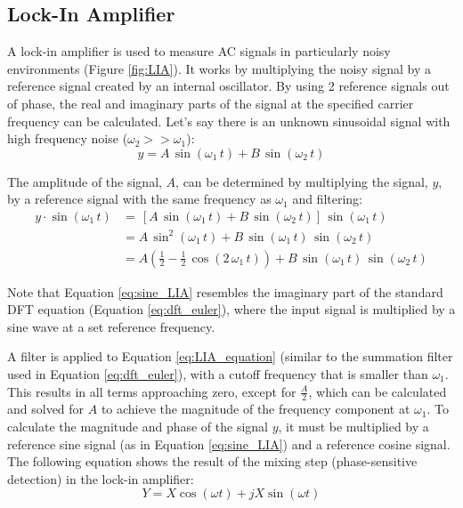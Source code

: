 \subsection{Lock-In Amplifier}

A lock-in amplifier is used to measure AC signals in particularly noisy environments (Figure \ref{fig:LIA}).  It works by multiplying the noisy signal by a reference signal created by an internal oscillator.  By using 2 reference signals out of phase, the real and imaginary parts of the signal at the specified carrier frequency can be calculated\cite{LIA_document}.  Let's say there is an unknown sinusoidal signal with high frequency noise ($\omega_2 >> \omega_1$):
\begin{equation}
	y = A \,\sin{(\omega_1 \, t)} + B\,\sin{(\omega_2 \, t)}
\end{equation}

The amplitude of the signal, $A$, can be determined by multiplying the signal, $y$, by a reference signal with the same frequency as $\omega_1$ and filtering:
\begin{align}
	y \cdot \sin{(\omega_1 \, t)} &= \, \left[A \,\sin{(\omega_1 \, t)} + B\,\sin{(\omega_2 \, t)}\right] \, \sin{(\omega_1\,t)} \label{eq:sine_LIA}\\
	&=A\,\sin^2{(\omega_1\,t)} + B\,\sin{(\omega_1\,t)}\,\sin{(\omega_2\,t)} \\
	&=A\left(\frac{1}{2} - \frac{1}{2}\,\cos{(2\,\omega_1\,t)}\right) + B\,\sin{(\omega_1\,t)}\,\sin{(\omega_2\,t)} \label{eq:LIA_equation}
\end{align}

Note that Equation \ref{eq:sine_LIA} resembles the imaginary part of the standard DFT equation (Equation \ref{eq:dft_euler}), where the input signal is multiplied by a sine wave at a set reference frequency.

A filter is applied to Equation \ref{eq:LIA_equation} (similar to the summation filter used in Equation \ref{eq:dft_euler}), with a cutoff frequency that is smaller than $\omega_1$.  This results in all terms approaching zero, except for $\frac{A}{2}$, which can be calculated and solved for $A$ to achieve the magnitude of the frequency component at $\omega_1$.  To calculate the magnitude and phase of the signal $y$, it must be multiplied by a reference sine signal (as in Equation \ref{eq:sine_LIA}) and a reference cosine signal.  The following equation shows the result of the mixing step (phase-sensitive detection) in the lock-in amplifier:
\begin{equation} \label{eq:LIA_mixing}
	Y = X \cos{(\omega t)} + j X \sin{(\omega t)}
\end{equation}

